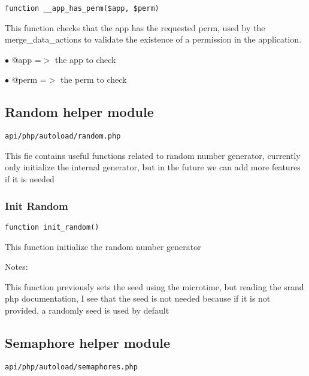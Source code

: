 \documentclass[a4paper]{article}
\begin{document}
\begin{lstlisting}
function __app_has_perm($app, $perm)
\end{lstlisting}

This function checks that the app has the requested perm, used by the
merge\_data\_actions to validate the existence of a permission in the
application.

\begin{compactitem}
\item[\color{myblue}$\bullet$] @app  =$>$ the app to check
\item[\color{myblue}$\bullet$] @perm =$>$ the perm to check
\end{compactitem}

\hypertarget{toc200}{}
\subsection{Random helper module}

\begin{lstlisting}
api/php/autoload/random.php
\end{lstlisting}

This fie contains useful functions related to random number generator, currently only initialize
the internal generator, but in the future we can add more features if it is needed

\hypertarget{toc201}{}
\subsubsection{Init Random}

\begin{lstlisting}
function init_random()
\end{lstlisting}

This function initialize the random number generator

Notes:

This function previously sets the seed using the microtime, but reading
the srand php documentation, I see that the seed is not needed because
if it is not provided, a randomly seed is used by default

\hypertarget{toc202}{}
\subsection{Semaphore helper module}

\begin{lstlisting}
api/php/autoload/semaphores.php
\end{lstlisting}
\end{document}
